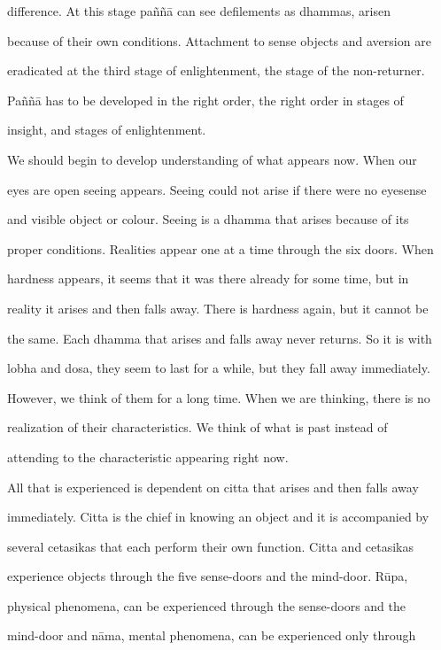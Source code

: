 difference.   At   this   stage   paññā   can   see   defilements   as   dhammas,   arisen  

because of their own conditions. Attachment to sense objects and aversion are  

eradicated at the third stage of enlightenment, the stage of the non-returner.  

Paññā  has  to  be  developed  in  the  right  order,  the  right  order  in  stages  of  

insight, and stages of enlightenment. 

   We should begin to develop understanding of what appears now. When our  

eyes are open seeing appears. Seeing could not arise if there were no eyesense  

and visible   object  or  colour.  Seeing  is  a  dhamma  that  arises  because  of  its  

proper conditions. Realities appear one at a time through the six doors. When  

hardness  appears,  it  seems  that  it  was   there  already  for  some  time,  but  in  

reality it arises and then falls away. There is hardness again, but it cannot be  

the same. Each dhamma that arises and falls away never returns. So it is with  

lobha and dosa, they seem to last for a while, but they fall away immediately.  

However, we think of them for a long time. When we are thinking, there is no  

realization   of   their   characteristics.   We   think   of   what   is   past   instead   of  

attending to the characteristic appearing right now. 

   All that is experienced is dependent on citta that arises and then falls away  

immediately. Citta is the chief in knowing an object and it is accompanied by  

several  cetasikas  that  each  perform  their  own  function.  Citta  and  cetasikas  

experience  objects  through   the   five   sense-doors   and   the  mind-door.   Rūpa,  

physical   phenomena,  can  be   experienced  through   the   sense-doors   and   the  

mind-door  and  nāma,  mental  phenomena,  can be  experienced  only  through  

